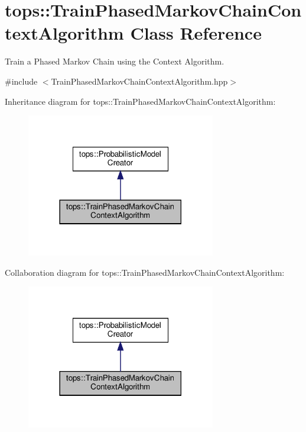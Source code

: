 \hypertarget{classtops_1_1TrainPhasedMarkovChainContextAlgorithm}{}\section{tops\+:\+:Train\+Phased\+Markov\+Chain\+Context\+Algorithm Class Reference}
\label{classtops_1_1TrainPhasedMarkovChainContextAlgorithm}


Train a Phased Markov Chain using the Context Algorithm.  




{\ttfamily \#include $<$Train\+Phased\+Markov\+Chain\+Context\+Algorithm.\+hpp$>$}



Inheritance diagram for tops\+:\+:Train\+Phased\+Markov\+Chain\+Context\+Algorithm\+:
\nopagebreak
\begin{figure}[H]
\begin{center}
\leavevmode
\includegraphics[width=234pt]{classtops_1_1TrainPhasedMarkovChainContextAlgorithm__inherit__graph}
\end{center}
\end{figure}


Collaboration diagram for tops\+:\+:Train\+Phased\+Markov\+Chain\+Context\+Algorithm\+:
\nopagebreak
\begin{figure}[H]
\begin{center}
\leavevmode
\includegraphics[width=234pt]{classtops_1_1TrainPhasedMarkovChainContextAlgorithm__coll__graph}
\end{center}
\end{figure}
